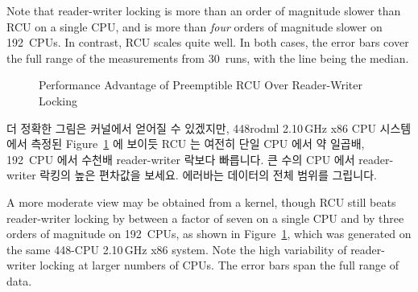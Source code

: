 Note that reader-writer locking is more than an order of magnitude slower
than RCU on a single CPU, and is more than \emph{four} orders of magnitude
slower on 192~CPUs.
In contrast, RCU scales quite well.
In both cases, the error bars cover the full range of the measurements
from 30~runs, with the line being the median.

\fi

\begin{figure}[tb]
\centering
{}
\caption{Performance Advantage of Preemptible RCU Over Reader-Writer Locking}
\label{fig:defer:Performance Advantage of Preemptible RCU Over Reader-Writer Locking}
\end{figure}

더 정확한 그림은  커널에서 얻어질 수 있겠지만, 448rodml
2.10\,GHz x86 CPU 시스템에서 측정된
Figure~\ref{fig:defer:Performance Advantage of Preemptible RCU Over Reader-Writer Locking}
에 보이듯 RCU 는 여전히 단일 CPU 에서 약 일곱배, 192~CPU 에서 수천배
reader-writer 락보다 빠릅니다.
큰 수의 CPU 에서 reader-writer 락킹의 높은 편차값을 보세요.
에러바는 데이터의 전체 범위를 그립니다.

\iffalse

A more moderate view may be obtained from a  kernel,
though RCU still beats reader-writer locking by between a factor of seven
on a single CPU and by three orders of magnitude on 192~CPUs, as shown in
Figure~\ref{fig:defer:Performance Advantage of Preemptible RCU Over Reader-Writer Locking},
which was generated on the same 448-CPU 2.10\,GHz x86 system.
Note the high variability of reader-writer locking at larger numbers of CPUs.
The error bars span the full range of data.

